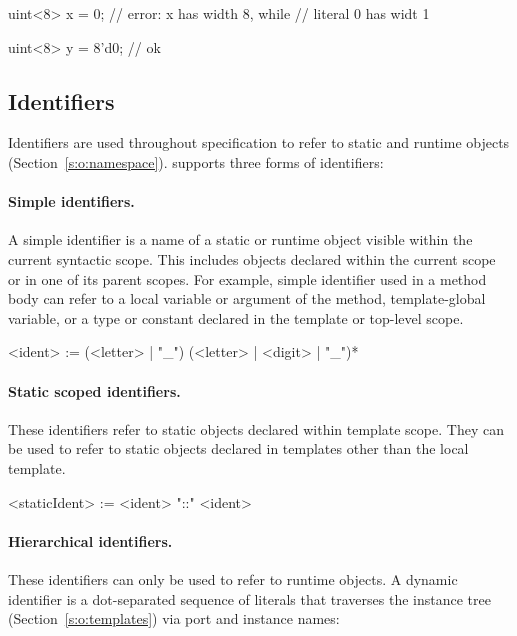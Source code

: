 \begin{tsllisting2}
uint<8> x = 0; // error: x has width 8, while
               // literal 0 has widt 1

uint<8> y = 8'd0; // ok
\end{tsllisting2}


\subsection{Identifiers}\label{s:r:identifiers}

Identifiers are used throughout \tsl specification to refer to 
static and runtime objects (Section~\ref{s:o:namespace}).  \tsl 
supports three forms of identifiers:

\paragraph{Simple identifiers.}  A simple identifier is a name of 
a static or runtime object visible within the current syntactic 
scope.  This includes objects declared within the current scope or 
in one of its parent scopes.  For example, simple identifier 
 used in a method body can refer to a local variable or 
argument of the method, template-global variable, or a type or 
constant declared in the template or top-level scope.

\begin{bnflisting}
<ident> := (<letter> | "_") (<letter> | <digit> | "_")*
\end{bnflisting}

\paragraph{Static scoped identifiers.} These identifiers refer to 
static objects declared within template scope.  They can be used 
to refer to static objects declared in templates other than the 
local template.

\begin{bnflisting}
<staticIdent> := <ident> "::" <ident>
\end{bnflisting}

\paragraph{Hierarchical identifiers.}  These identifiers can only 
be used to refer to runtime objects.  A dynamic identifier is a 
dot-separated sequence of literals that traverses the instance 
tree (Section~\ref{s:o:templates}) via port and instance names:

